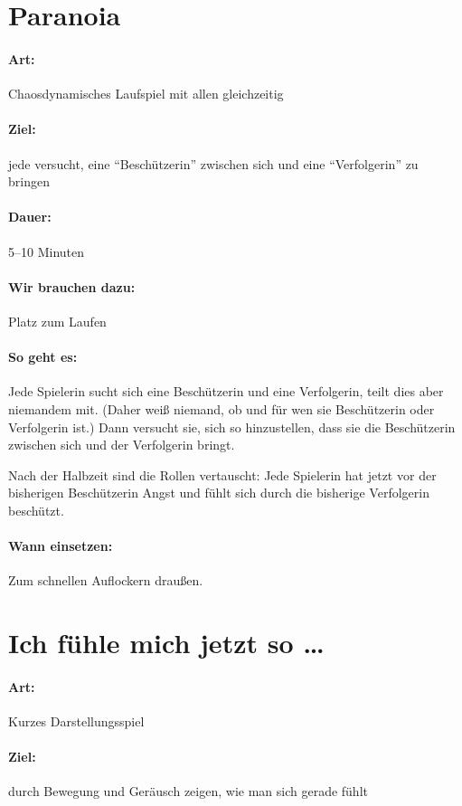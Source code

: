 \section{Paranoia}
\paragraph{Art:} Chaosdynamisches Laufspiel mit allen gleichzeitig
\paragraph{Ziel:} jede versucht, eine "`Beschützerin"' zwischen sich und eine "`Verfolgerin"' zu bringen
\paragraph{Dauer:} 5--10 Minuten
\paragraph{Wir brauchen dazu:} Platz zum Laufen
\paragraph{So geht es:} Jede Spielerin sucht sich eine Beschützerin und eine Verfolgerin, teilt dies aber niemandem mit. (Daher weiß niemand, ob und für wen sie Beschützerin oder Verfolgerin ist.) Dann versucht sie, sich so hinzustellen, dass sie die Beschützerin zwischen sich und der Verfolgerin bringt.

Nach der Halbzeit sind die Rollen vertauscht: Jede Spielerin hat jetzt vor der bisherigen Beschützerin Angst und fühlt sich durch die bisherige Verfolgerin beschützt.
\paragraph{Wann einsetzen:} Zum schnellen Auflockern draußen.

\section{Ich fühle mich jetzt so \ldots}
\paragraph{Art:} Kurzes Darstellungsspiel
\paragraph{Ziel:} durch Bewegung und Geräusch zeigen, wie man sich gerade fühlt
